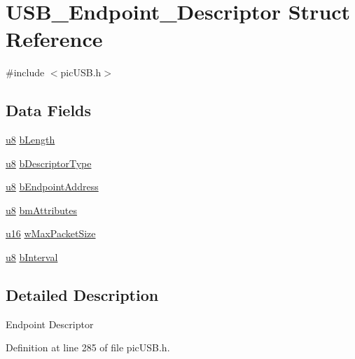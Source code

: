 \hypertarget{struct_u_s_b___endpoint___descriptor}{\section{U\-S\-B\-\_\-\-Endpoint\-\_\-\-Descriptor Struct Reference}
\label{struct_u_s_b___endpoint___descriptor}
}


{\ttfamily \#include $<$pic\-U\-S\-B.\-h$>$}

\subsection*{Data Fields}
\begin{DoxyCompactItemize}
\item 
\hyperlink{p8_2pinguino_2core_2typedef_8h_aed742c436da53c1080638ce6ef7d13de}{u8} \hyperlink{struct_u_s_b___endpoint___descriptor_a904ce9aea3e1db94a9a1ec5a0a22b65d}{b\-Length}
\item 
\hyperlink{p8_2pinguino_2core_2typedef_8h_aed742c436da53c1080638ce6ef7d13de}{u8} \hyperlink{struct_u_s_b___endpoint___descriptor_af6d6c7e334878414c973fc10e54cfb4e}{b\-Descriptor\-Type}
\item 
\hyperlink{p8_2pinguino_2core_2typedef_8h_aed742c436da53c1080638ce6ef7d13de}{u8} \hyperlink{struct_u_s_b___endpoint___descriptor_a8351ae3c49da08fc3a37d58d4a0e2d84}{b\-Endpoint\-Address}
\item 
\hyperlink{p8_2pinguino_2core_2typedef_8h_aed742c436da53c1080638ce6ef7d13de}{u8} \hyperlink{struct_u_s_b___endpoint___descriptor_a2733c047911192e6e1630eb85167cd42}{bm\-Attributes}
\item 
\hyperlink{p8_2pinguino_2core_2typedef_8h_a50b0d1c7a54fa09a64a3ac111c778520}{u16} \hyperlink{struct_u_s_b___endpoint___descriptor_a6b9f4ee406e56ca4242b5c7502060842}{w\-Max\-Packet\-Size}
\item 
\hyperlink{p8_2pinguino_2core_2typedef_8h_aed742c436da53c1080638ce6ef7d13de}{u8} \hyperlink{struct_u_s_b___endpoint___descriptor_a7284387b387d9ade2b7537ee8f87372e}{b\-Interval}
\end{DoxyCompactItemize}


\subsection{Detailed Description}
Endpoint Descriptor 

Definition at line 285 of file pic\-U\-S\-B.\-h.



